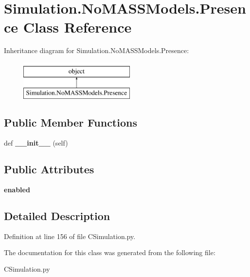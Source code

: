 \hypertarget{class_c_simulation_1_1_simulation_1_1_no_m_a_s_s_models_1_1_presence}{}\section{Simulation.\+No\+M\+A\+S\+S\+Models.\+Presence Class Reference}
\label{class_c_simulation_1_1_simulation_1_1_no_m_a_s_s_models_1_1_presence}
Inheritance diagram for Simulation.\+No\+M\+A\+S\+S\+Models.\+Presence\+:\begin{figure}[H]
\begin{center}
\leavevmode
\includegraphics[height=2.000000cm]{class_c_simulation_1_1_simulation_1_1_no_m_a_s_s_models_1_1_presence}
\end{center}
\end{figure}
\subsection*{Public Member Functions}
\begin{DoxyCompactItemize}
\item 
\mbox{\label{class_c_simulation_1_1_simulation_1_1_no_m_a_s_s_models_1_1_presence_ae64f0875afe3067b97ba370b354b9213}} 
def {\bfseries \+\_\+\+\_\+init\+\_\+\+\_\+} (self)
\end{DoxyCompactItemize}
\subsection*{Public Attributes}
\begin{DoxyCompactItemize}
\item 
\mbox{\label{class_c_simulation_1_1_simulation_1_1_no_m_a_s_s_models_1_1_presence_a91b39549c797bd5646357c8b6eecad0f}} 
{\bfseries enabled}
\end{DoxyCompactItemize}


\subsection{Detailed Description}


Definition at line 156 of file C\+Simulation.\+py.



The documentation for this class was generated from the following file\+:\begin{DoxyCompactItemize}
\item 
C\+Simulation.\+py\end{DoxyCompactItemize}
